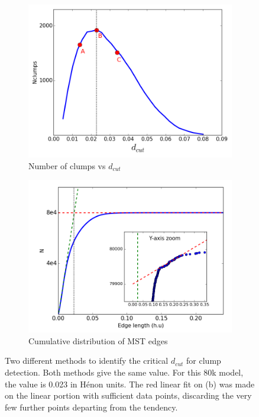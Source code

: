  \begin{figure}
\center
    \centering
    \begin{subfigure}[b]{0.49\textwidth}
    	\centering
    	\includegraphics[width=\textwidth]{Figures/2_Ndcut.png}
        \caption{Number of clumps vs $d_{cut}$}
        \label{Fig:2_Ndcut}
    \end{subfigure}
    \begin{subfigure}[b]{0.49\textwidth}
    	\centering
    	\includegraphics[width=\textwidth]{Figures/2_dcutdistribution.png}
        \caption{Cumulative distribution of MST edges}
        \label{Fig:2_dcutcumulated}
    \end{subfigure}
\caption{Two different methods to identify the critical $d_{cut}$ for clump detection. Both methods give the same value. For this 80k model, the value is 0.023 in H\'enon units. The red linear fit on (b) was made on the linear portion with sufficient data points, discarding the very few further points departing from the tendency.}
\label{Fig:0_dcutchoice}
\end{figure}


